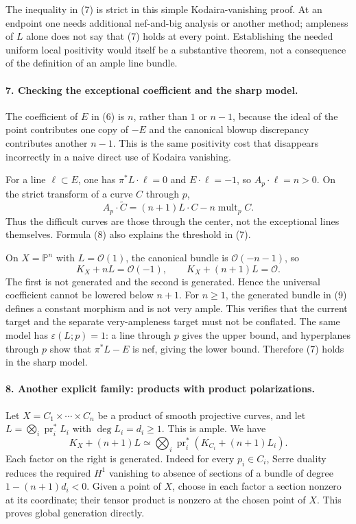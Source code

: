 \documentclass[11pt]{article}
\begin{document}
The inequality in (7) is strict in this simple Kodaira-vanishing proof. At an endpoint one needs additional nef-and-big analysis or another method; ampleness of $L$ alone does not say that (7) holds at every point. Establishing the needed uniform local positivity would itself be a substantive theorem, not a consequence of the definition of an ample line bundle.

\paragraph{7. Checking the exceptional coefficient and the sharp model.}
The coefficient of $E$ in (6) is $n$, rather than $1$ or $n-1$, because the ideal of the point contributes one copy of $-E$ and the canonical blowup discrepancy contributes another $n-1$. This is the same positivity cost that disappears incorrectly in a naive direct use of Kodaira vanishing.

For a line $\ell\subset E$, one has $\pi^*L\cdot\ell=0$ and $E\cdot\ell=-1$, so $A_p\cdot\ell=n>0$. On the strict transform of a curve $C$ through $p$,
\[
 A_p\cdot\widetilde C=(n+1)L\cdot C
                   -n\operatorname{mult}_pC.          \tag{8}
\]
Thus the difficult curves are those through the center, not the exceptional lines themselves. Formula (8) also explains the threshold in (7).

On $X=\mathbb P^n$ with $L=\mathcal O(1)$, the canonical bundle is $\mathcal O(-n-1)$, so
\[
 K_X+nL=\mathcal O(-1),\qquad
 K_X+(n+1)L=\mathcal O.                                \tag{9}
\]
The first is not generated and the second is generated. Hence the universal coefficient cannot be lowered below $n+1$. For $n\ge1$, the generated bundle in (9) defines a constant morphism and is not very ample. This verifies that the current target and the separate very-ampleness target must not be conflated. The same model has $\varepsilon(L;p)=1$: a line through $p$ gives the upper bound, and hyperplanes through $p$ show that $\pi^*L-E$ is nef, giving the lower bound. Therefore (7) holds in the sharp model.

\paragraph{8. Another explicit family: products with product polarizations.}
Let $X=C_1\times\cdots\times C_n$ be a product of smooth projective curves, and let $L=\bigotimes_i\operatorname{pr}_i^*L_i$ with $\deg L_i=d_i\ge1$. This is ample. We have
\[
 K_X+(n+1)L\simeq
 \bigotimes_i\operatorname{pr}_i^*(K_{C_i}+(n+1)L_i).
\]
Each factor on the right is generated. Indeed for every $p_i\in C_i$, Serre duality reduces the required $H^1$ vanishing to absence of sections of a bundle of degree $1-(n+1)d_i<0$. Given a point of $X$, choose in each factor a section nonzero at its coordinate; their tensor product is nonzero at the chosen point of $X$. This proves global generation directly.
\end{document}
